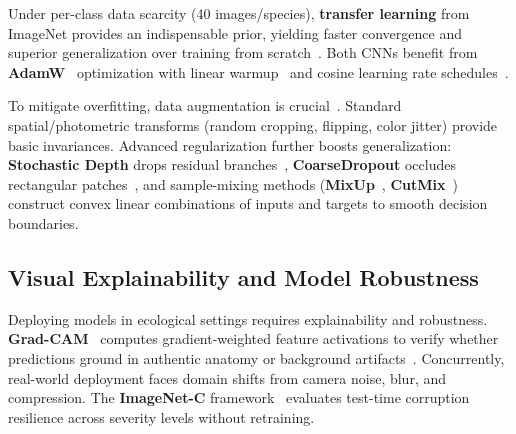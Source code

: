 Under per-class data scarcity (40 images/species), \textbf{transfer learning} from ImageNet provides an indispensable prior, yielding faster convergence and superior generalization over training from scratch~\cite{zhuang2021transfer}. Both CNNs benefit from \textbf{AdamW}~\cite{loshchilov2019decoupled} optimization with linear warmup~\cite{he2019bagoftricks} and cosine learning rate schedules~\cite{loshchilov2017sgdr}.

To mitigate overfitting, data augmentation is crucial~\cite{shorten2019survey}. Standard spatial/photometric transforms (random cropping, flipping, color jitter) provide basic invariances. Advanced regularization further boosts generalization: \textbf{Stochastic Depth} drops residual branches~\cite{huang2016stochastic}, \textbf{CoarseDropout} occludes rectangular patches~\cite{devries2017improved}, and sample-mixing methods (\textbf{MixUp}~\cite{zhang2017mixup}, \textbf{CutMix}~\cite{yun2019cutmix}) construct convex linear combinations of inputs and targets to smooth decision boundaries.

\subsection{Visual Explainability and Model Robustness}
\label{sec:litreview-eval}
\label{sec:litreview-interpretability}
\label{sec:litreview-robustness}

Deploying models in ecological settings requires explainability and robustness. \textbf{Grad-CAM}~\cite{selvaraju2017grad} computes gradient-weighted feature activations to verify whether predictions ground in authentic anatomy or background artifacts~\cite{zhou2016learning}. Concurrently, real-world deployment faces domain shifts from camera noise, blur, and compression. The \textbf{ImageNet-C} framework~\cite{hendrycks2019robustness} evaluates test-time corruption resilience across severity levels without retraining.

